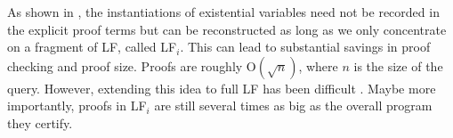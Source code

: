 \documentclass{llncs}
\newcommand{\figfoot}{\vspace{1ex}\hrule}
\newcommand{\fighead}{\hrule\vspace{1.5ex}}
\newcommand{\nil}{\mathsf{nil}}
\newcommand{\vd}{\vdash}
\newcommand{\arrow}{\rightarrow}
\newcommand{\oftp}{\mathord{:}}
\begin{document}

As shown in \cite{Necula98lics}, the instantiations of existential
variables need not be recorded in the explicit proof terms but can be
reconstructed as long as we only concentrate on a fragment of LF,
called LF$_i$. This can lead to substantial savings in proof checking
and proof size. Proofs are roughly $\mathrm{O}(\sqrt{n})$, where $n$ is the
size of the query. However, extending this idea to full LF has been
difficult \cite{Reed04lfm}. Maybe more importantly, proofs in LF$_i$
are still several times as big as the overall program they certify. 
\end{document}
